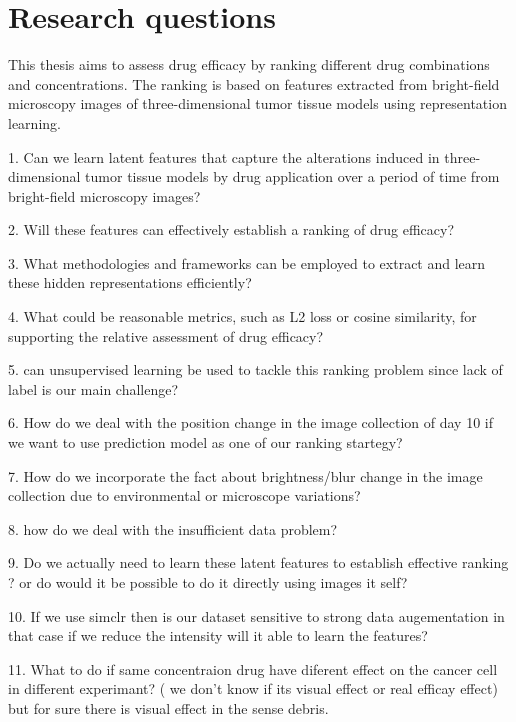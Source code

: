 \chapter{Research questions}\label{ch:Research questions}
This thesis aims to assess drug efficacy by ranking different drug combinations and concentrations. 
The ranking is based on features extracted from bright-field microscopy images of  three-dimensional tumor tissue models using
representation learning. 

1. Can we learn latent features that capture the alterations 
induced in three-dimensional tumor tissue models by drug application over a period of time from bright-field microscopy images?

2.  Will these features can effectively establish a ranking of drug efficacy?

3. What methodologies and frameworks can be employed to extract and learn these
 hidden representations efficiently?

4. What could be reasonable metrics, such as L2 loss or cosine similarity, for 
supporting the relative assessment of drug efficacy?

5. can unsupervised learning be used to tackle this ranking problem since lack of label is 
our main challenge?

6. How do we deal with the position change in the image collection of day 10 if we want to use prediction 
model as one of our ranking startegy?

7. How do we incorporate the fact about brightness/blur change in the image collection due to environmental or microscope 
variations?

8. how do we deal with the insufficient data problem?

9. Do we actually need to learn these latent features to establish effective ranking ? or do would it be possible to do it directly using images it self?

10. If we use simclr then is our dataset sensitive to strong data augementation in that case if we reduce the intensity will it able to learn the features?

11. What to do if same concentraion drug have diferent effect on the cancer cell in different experimant? ( we don't know if its visual effect or real efficay effect)
but for sure there is visual effect in the sense debris. 
